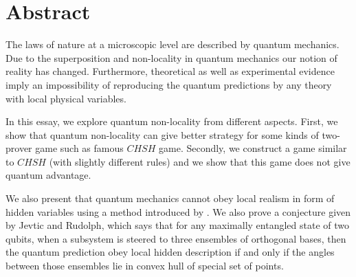 
\chapter*{Abstract} 
The laws of nature at a microscopic level are described by quantum mechanics. Due to the superposition and non-locality in quantum mechanics our notion of reality has changed. Furthermore, theoretical  as well as experimental evidence imply an impossibility of reproducing the quantum predictions  by any theory with local physical variables.

In this essay, we explore quantum non-locality from different aspects. First, we show that quantum non-locality can give better strategy for some kinds  of two-prover game such as famous $CHSH$ game. Secondly, we construct a game similar to  $CHSH$ (with slightly different rules) and we show that this game  does not give quantum advantage.

We also present that quantum mechanics cannot obey local realism in form of hidden variables using a method introduced by \citet*{Jevtic:2015:10.1364/JOSAB.32.000A50}. We also prove a conjecture given by Jevtic and Rudolph, which says that for any maximally entangled state of two qubits, when a subsystem is steered to three ensembles of orthogonal bases, then the quantum prediction obey  local hidden description if and only if the angles between those ensembles lie in convex hull of special set of points.



%
%
%





